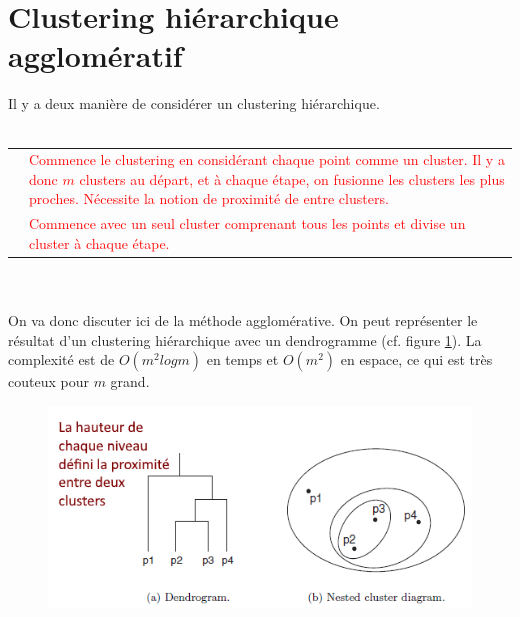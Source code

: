 \documentclass[letterpaper, 12pt]{article}
\newcommand{\alinea}{
\hspace*{0.5cm}}
\newcommand{\red}[1]{
	\textcolor{red}{#1}}
\newcommand{\myul}[1]{
		\underline{\smash{#1}}
	}
\begin{document}
	\section{Clustering hiérarchique agglomératif}
		\alinea Il y a deux manière de considérer un clustering hiérarchique.
		\\~\\
		\begin{tabular}{lp{12cm}}
			\myul{\textbf{\hl{Agglomératif}}} & 
				\red{Commence le clustering en considérant chaque point
					 comme un cluster. Il y a donc $m$ clusters au départ,
					 et à chaque étape, on fusionne les clusters les
					 plus proches. Nécessite la notion de proximité de
					 entre clusters.}\\
			\myul{\textbf{\hl{Divisif}}} & 
				\red{Commence avec un seul cluster comprenant tous
					 les points et divise un cluster à chaque étape.}
		\end{tabular}~\\~\\
		On va donc discuter ici de la méthode agglomérative. On
		peut représenter le résultat d'un clustering hiérarchique avec 
		un dendrogramme (cf. figure \ref{fig:dendrogram}). La complexité
		est de $O(m^2log m)$ en temps et $O(m^2)$ en espace, ce qui est
		très couteux pour $m$ grand.
		\begin{figure}[H]
			\centering
			\includegraphics[scale=0.8]{Images/dendrogram.png}
			\caption{}
			\label{fig:dendrogram}
		\end{figure}\noindent
\end{document}
